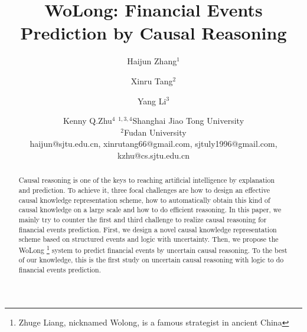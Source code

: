 \documentclass{article}
\title{WoLong: Financial Events Prediction by Causal Reasoning}
\author{
Haijun Zhang$^1$\and
Xinru Tang$^2$\and
Yang Li$^3$\and
Kenny Q.Zhu$^{4}$
\affiliations
$^{1,3,4}$Shanghai Jiao Tong University\\
$^2$Fudan University \\
\emails
haijun@sjtu.edu.cn,
xinrutang66@gmail.com,
sjtuly1996@gmail.com,
kzhu@cs.sjtu.edu.cn
}
\newcommand{\KZ}[1]{{\bf \color{red} KZ: #1}}
\begin{document}
\maketitle
\begin{abstract}
Causal reasoning is one of the keys to reaching artificial intelligence by explanation and prediction. 
To achieve it, three focal challenges are how to design an effective causal knowledge representation scheme, how to automatically obtain this kind of causal knowledge on a large scale and how to do efficient reasoning. 
In this paper, we mainly try to counter the first and third challenge to realize causal reasoning for financial events prediction.
First, we design a novel causal knowledge representation scheme based on structured events and logic with uncertainty. Then, we propose the WoLong \footnote{ Zhuge Liang, nicknamed Wolong, is a famous strategist in ancient China} system to predict financial events by uncertain causal reasoning. To the best of our knowledge, this is the first study on uncertain causal reasoning with logic to do financial events prediction.
\end{abstract}
\begin{CJK}{UTF8}{gkai}






\end{CJK}
\end{document}
